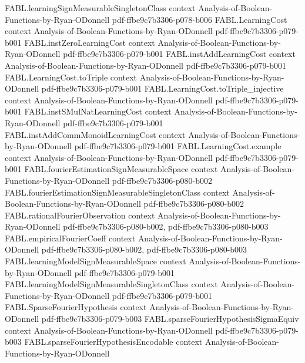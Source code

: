 \begin{theorem}
\proofstep
  {FABL.learningSignMeasurableSingletonClass}
  {context}
  {Analysis-of-Boolean-Functions-by-Ryan-ODonnell}
  {pdf-ffbe9c7b3306-p078-b006}
\proofstep
  {FABL.LearningCost}
  {context}
  {Analysis-of-Boolean-Functions-by-Ryan-ODonnell}
  {pdf-ffbe9c7b3306-p079-b001}
\proofstep
  {FABL.instZeroLearningCost}
  {context}
  {Analysis-of-Boolean-Functions-by-Ryan-ODonnell}
  {pdf-ffbe9c7b3306-p079-b001}
\proofstep
  {FABL.instAddLearningCost}
  {context}
  {Analysis-of-Boolean-Functions-by-Ryan-ODonnell}
  {pdf-ffbe9c7b3306-p079-b001}
\proofstep
  {FABL.LearningCost.toTriple}
  {context}
  {Analysis-of-Boolean-Functions-by-Ryan-ODonnell}
  {pdf-ffbe9c7b3306-p079-b001}
\proofstep
  {FABL.LearningCost.toTriple_injective}
  {context}
  {Analysis-of-Boolean-Functions-by-Ryan-ODonnell}
  {pdf-ffbe9c7b3306-p079-b001}
\proofstep
  {FABL.instSMulNatLearningCost}
  {context}
  {Analysis-of-Boolean-Functions-by-Ryan-ODonnell}
  {pdf-ffbe9c7b3306-p079-b001}
\proofstep
  {FABL.instAddCommMonoidLearningCost}
  {context}
  {Analysis-of-Boolean-Functions-by-Ryan-ODonnell}
  {pdf-ffbe9c7b3306-p079-b001}
\proofstep
  {FABL.LearningCost.example}
  {context}
  {Analysis-of-Boolean-Functions-by-Ryan-ODonnell}
  {pdf-ffbe9c7b3306-p079-b001}
\proofstep
  {FABL.fourierEstimationSignMeasurableSpace}
  {context}
  {Analysis-of-Boolean-Functions-by-Ryan-ODonnell}
  {pdf-ffbe9c7b3306-p080-b002}
\proofstep
  {FABL.fourierEstimationSignMeasurableSingletonClass}
  {context}
  {Analysis-of-Boolean-Functions-by-Ryan-ODonnell}
  {pdf-ffbe9c7b3306-p080-b002}
\proofstep
  {FABL.rationalFourierObservation}
  {context}
  {Analysis-of-Boolean-Functions-by-Ryan-ODonnell}
  {pdf-ffbe9c7b3306-p080-b002,
    pdf-ffbe9c7b3306-p080-b003}
\proofstep
  {FABL.empiricalFourierCoeff}
  {context}
  {Analysis-of-Boolean-Functions-by-Ryan-ODonnell}
  {pdf-ffbe9c7b3306-p080-b002,
    pdf-ffbe9c7b3306-p080-b003}
\proofstep
  {FABL.learningModelSignMeasurableSpace}
  {context}
  {Analysis-of-Boolean-Functions-by-Ryan-ODonnell}
  {pdf-ffbe9c7b3306-p079-b001}
\proofstep
  {FABL.learningModelSignMeasurableSingletonClass}
  {context}
  {Analysis-of-Boolean-Functions-by-Ryan-ODonnell}
  {pdf-ffbe9c7b3306-p079-b001}
\proofstep
  {FABL.SparseFourierHypothesis}
  {context}
  {Analysis-of-Boolean-Functions-by-Ryan-ODonnell}
  {pdf-ffbe9c7b3306-p079-b003}
\proofstep
  {FABL.sparseFourierHypothesisSigmaEquiv}
  {context}
  {Analysis-of-Boolean-Functions-by-Ryan-ODonnell}
  {pdf-ffbe9c7b3306-p079-b003}
\proofstep
  {FABL.sparseFourierHypothesisEncodable}
  {context}
  {Analysis-of-Boolean-Functions-by-Ryan-ODonnell}

\end{theorem}
